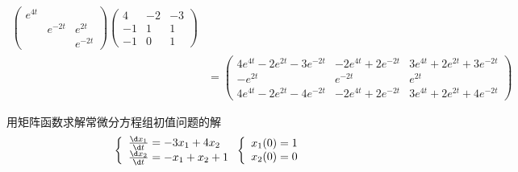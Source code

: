 \documentclass[12pt, a4paper, oneside, UTF8]{ctexbook}
\begin{document}
\begin{solution}
\begin{align*}
\begin{pmatrix}
            e^{4t}& & \\
            & e^{-2t}&e^{2t} \\
            & & e^{-2t}
        \end{pmatrix}\begin{pmatrix}
            4&-2&-3\\
            -1&1&1\\
            -1&0&1       
        \end{pmatrix}\\
        &=\begin{pmatrix}
            4e^{4t}-2e^{2t}-3e^{-2t}&-2e^{4t}+2e^{-2t}&3e^{4t}+2e^{2t}+3e^{-2t}\\
            -e^{2t}&e^{-2t}&e^{2t}\\
            4e^{4t}-2e^{2t}-4e^{-2t}&-2e^{4t}+2e^{-2t}&3e^{4t}+2e^{2t}+4e^{-2t}
        \end{pmatrix}
    \end{align*}
\end{solution}

\begin{question}
    用矩阵函数求解常微分方程组初值问题的解
    \begin{align*}
    \left\{
        \begin{array}{ll}
            \frac{\d x_1}{\d t}=-3x_1+4x_2\\
            \frac{\d x_2}{\d t}=-x_1+x_2+1
        \end{array}
        \right.
    \left\{
        \begin{array}{ll}
            x_1(0)=1\\
            x_2(0)=0
        \end{array}
        \right.
    \end{align*}
\end{question}
\end{document}
